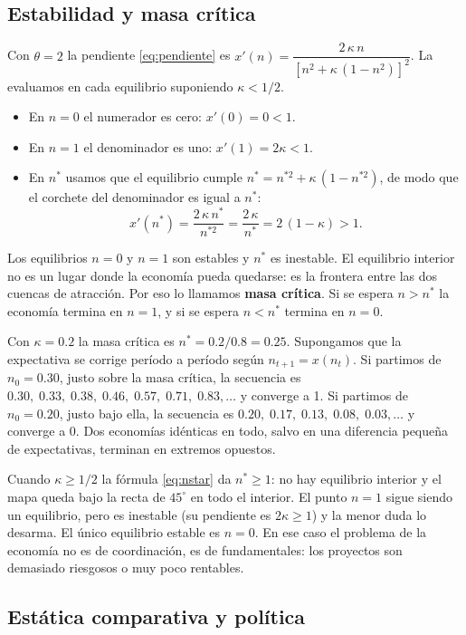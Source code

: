 \documentclass[12pt,letterpaper]{article}
\begin{document}
\subsection{Estabilidad y masa crítica}

Con $\theta=2$ la pendiente \eqref{eq:pendiente} es $x'(n)=\dfrac{2\,\kappa\,n}{\left[n^{2}+\kappa\,(1-n^{2})\right]^{2}}$. La evaluamos en cada equilibrio suponiendo $\kappa<1/2$.
\begin{itemize}
  \item En $n=0$ el numerador es cero: $x'(0)=0<1$.
  \item En $n=1$ el denominador es uno: $x'(1)=2\kappa<1$.
  \item En $n^*$ usamos que el equilibrio cumple $n^*=n^{*2}+\kappa\,(1-n^{*2})$, de modo que el corchete del denominador es igual a $n^*$:
  \[
    x'(n^*)=\frac{2\,\kappa\,n^*}{n^{*2}}=\frac{2\,\kappa}{n^*}=2\,(1-\kappa)>1 .
  \]
\end{itemize}
Los equilibrios $n=0$ y $n=1$ son estables y $n^*$ es inestable. El equilibrio interior no es un lugar donde la economía pueda quedarse: es la frontera entre las dos cuencas de atracción. Por eso lo llamamos \textbf{masa crítica}. Si se espera $n>n^*$ la economía termina en $n=1$, y si se espera $n<n^*$ termina en $n=0$.

\begin{intuicion}
Con $\kappa=0.2$ la masa crítica es $n^*=0.2/0.8=0.25$. Supongamos que la expectativa se corrige período a período según $n_{t+1}=x(n_t)$. Si partimos de $n_0=0.30$, justo sobre la masa crítica, la secuencia es $0.30,\;0.33,\;0.38,\;0.46,\;0.57,\;0.71,\;0.83,\dots$ y converge a 1. Si partimos de $n_0=0.20$, justo bajo ella, la secuencia es $0.20,\;0.17,\;0.13,\;0.08,\;0.03,\dots$ y converge a 0. Dos economías idénticas en todo, salvo en una diferencia pequeña de expectativas, terminan en extremos opuestos.
\end{intuicion}

Cuando $\kappa\geq1/2$ la fórmula \eqref{eq:nstar} da $n^*\geq1$: no hay equilibrio interior y el mapa queda bajo la recta de $45^{\circ}$ en todo el interior. El punto $n=1$ sigue siendo un equilibrio, pero es inestable (su pendiente es $2\kappa\geq1$) y la menor duda lo desarma. El único equilibrio estable es $n=0$. En ese caso el problema de la economía no es de coordinación, es de fundamentales: los proyectos son demasiado riesgosos o muy poco rentables.

\subsection{Estática comparativa y política}
\end{document}

